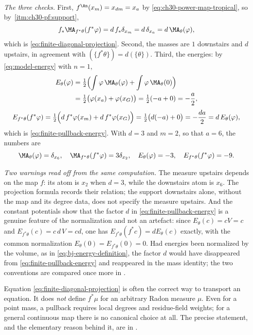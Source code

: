 \begin{example}
\emph{The three checks.}  First, $f^{\An}(x_m)=x_{dm}=x_a$ by
\eqref{eq:ch30-power-map-tropical}, so by
\,\cref{itm:ch30-pf:support},
\[
 f_*\MA_{f^*\theta}(f^*\varphi)
 =d\,f_*\delta_{x_m}
 =d\,\delta_{x_a}
 =d\,\MA_\theta(\varphi),
\]
which is \eqref{eq:finite-diagonal-projection}.  Second, the masses are
$1$ downstairs and $d$ upstairs, in agreement with
$(\{f^*\theta\})=d(\{\theta\})$.  Third, the energies: by
\eqref{eq:model-energy} with $n=1$,
\[
 \begin{aligned}
 E_\theta(\varphi)
 &=\tfrac12\Bigl(\int\varphi\,\MA_\theta(\varphi)
    +\int\varphi\,\MA_\theta(0)\Bigr)\\
 &=\tfrac12\bigl(\varphi(x_a)+\varphi(x_G)\bigr)
 =\tfrac12(-a+0)=-\frac a2 ,
 \end{aligned}
\]
\[
 E_{f^*\theta}(f^*\varphi)
 =\tfrac12\Bigl(d\,f^*\varphi(x_m)+d\,f^*\varphi(x_G)\Bigr)
 =\tfrac12\bigl(d(-a)+0\bigr)=-\frac{da}2
 =d\,E_\theta(\varphi),
\]
which is \eqref{eq:finite-pullback-energy}.  With $d=3$ and $m=2$, so
that $a=6$, the numbers are
\[
 \MA_\theta(\varphi)=\delta_{x_6},\quad
 \MA_{f^*\theta}(f^*\varphi)=3\delta_{x_2},\quad
 E_\theta(\varphi)=-3,\quad
 E_{f^*\theta}(f^*\varphi)=-9 .
\]

\emph{Two warnings read off from the same computation.}  The measure
upstairs depends on the map $f$: its atom is $x_2$ when $d=3$,
while the downstairs atom is $x_6$.  The projection formula records
their relation; the support downstairs alone, without the map and its
degree data, does not specify the measure upstairs.  And the constant potentials show that the factor $d$ in
\eqref{eq:finite-pullback-energy} is a genuine feature of the normalization
and not an artefact: since $E_\theta(c)=cV=c$ and
$E_{f^*\theta}(c)=c\,d\,V=cd$, one has
$E_{f^*\theta}(f^*c)=dE_\theta(c)$ exactly, with the common normalization
$E_\theta(0)=E_{f^*\theta}(0)=0$.  Had energies been normalized by the
volume, as in \eqref{eq:bj-energy-definition}, the factor $d$ would have
disappeared from \eqref{eq:finite-pullback-energy} and reappeared in the
mass identity; the two conventions are compared once more in
.
\end{example}

Equation \eqref{eq:finite-diagonal-projection} is often the correct way to
transport an equation.  It does \emph{not} define $f^*\mu$ for an
arbitrary Radon measure $\mu$.  Even for a point mass, a pullback requires
local degrees and residue-field weights; for a general continuous map there
is no canonical choice at all.  The precise statement, and the elementary
reason behind it, are in .


